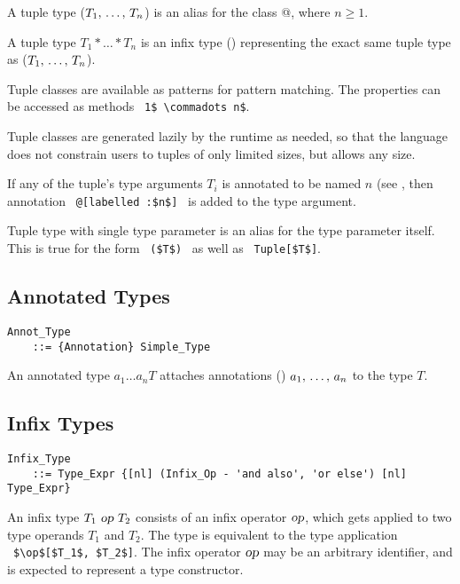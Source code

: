 A tuple type ($T_1 \commadots T_n$) is an alias for the class \lstinline@Tuple[$T_1 \commadots T_n$]@, where $n \geq 1$. 

A tuple type $T_1 * \ldots * T_n$ is an infix type () representing the exact same tuple type as ($T_1 \commadots T_n$).

Tuple classes are available as patterns for pattern matching. The properties can be accessed as methods ~\lstinline!1$ \commadots n$!. 

Tuple classes are generated lazily by the runtime as needed, so that the language does not constrain users to tuples of only limited sizes, but allows any size. 

If any of the tuple's type arguments $T_i$ is annotated to be named $n$ (see , then annotation ~\lstinline!@[labelled :$n$]!~ is added to the type argument. 

Tuple type with single type parameter is an alias for the type parameter itself. This is true for the form ~\lstinline!($T$)!~ as well as ~\lstinline!Tuple[$T$]!.






\subsection{Annotated Types}

\grammar\begin{lstlisting}
Annot_Type 
    ::= {Annotation} Simple_Type
\end{lstlisting}

An annotated type $a_1 \ldots a_n T$ attaches annotations () $a_1 ,\, \ldots ,\, a_n$ to the type $T$. 





\subsection{Infix Types}
\label{sec:infix-types}

\grammar\begin{lstlisting}
Infix_Type 
    ::= Type_Expr {[nl] (Infix_Op - 'and also', 'or else') [nl] Type_Expr}
\end{lstlisting}

An infix type $T_1\ \mbox{\sl op}\ T_2$ consists of an infix operator $\mbox{\sl op}$, which gets applied to two type operands $T_1$ and $T_2$. The type is equivalent to the type application ~\lstinline!$\op$[$T_1$, $T_2$]!. The infix operator $\mbox{\sl op}$ may be an arbitrary identifier, and is expected to represent a type constructor. 

